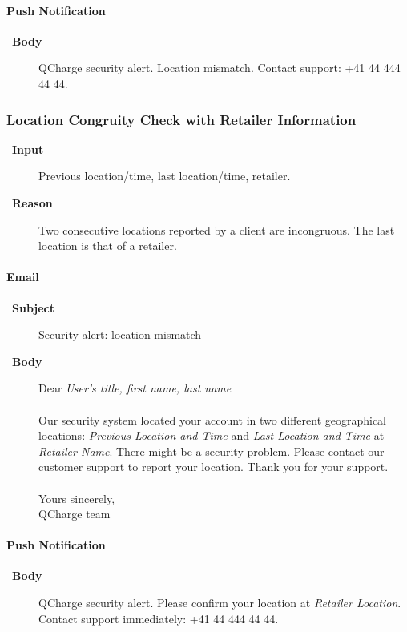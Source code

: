 \documentclass[a4paper,10pt]{article}
\let\Item\item
\newcommand\SpecialItem{\renewcommand\item[1][]{\Item[\textbullet~\bfseries##1]}
}
\begin{document}
\paragraph{Push Notification}
\SpecialItem
\begin{description}
 \item[Body] QCharge security alert. Location mismatch. Contact support: +41 44 
444 44 44.
\end{description}

\subsubsection{Location Congruity Check with Retailer Information}

\SpecialItem
\begin{description}
 \item[Input] Previous location/time, last location/time, retailer.
 \item[Reason] Two consecutive locations reported by a client are incongruous. 
The last location is that of a retailer.
\end{description}

\paragraph{Email}
\SpecialItem
\begin{description}
 \item[Subject] Security alert: location mismatch
 \item[Body]Dear \emph{User's title, first name, last name}
\\\\
Our security system located your account in two different geographical 
locations: \emph{Previous Location and Time} and \emph{Last Location and 
Time} at \emph{Retailer Name}. There might be a security problem. Please 
contact our customer support to report your location. Thank you for your 
support.
\\\\
Yours sincerely,\\
QCharge team

\end{description}

\paragraph{Push Notification}
\SpecialItem
\begin{description}
 \item[Body] QCharge security alert. Please confirm your location at 
\emph{Retailer Location}. Contact support immediately: +41 44 444 44 44.
\end{description}



\end{document}
